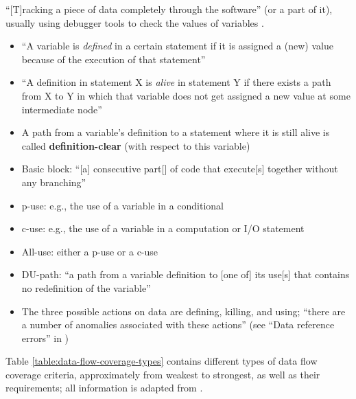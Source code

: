 ``[T]racking a piece of data completely through the software'' (or a part of
it), usually using debugger tools to check the values of variables
\cite[p.~114]{patton_software_2006}.

\begin{itemize}
      \item ``A variable is \emph{defined} in a certain statement if it is
            assigned a (new) value because of the execution of that
            statement'' \cite[p.~424]{van_vliet_software_2000}
      \item ``A definition in statement X is \emph{alive} in statement Y if
            there exists a path from X to Y in which that variable does not
            get assigned a new value at some intermediate node''
            \cite[p.~424]{van_vliet_software_2000}
      \item A path from a variable's definition to a statement where it is
            still alive is called \textbf{definition-clear} (with respect to
            this variable) \cite[p.~424]{van_vliet_software_2000}
      \item Basic block: ``[a] consecutive part[] of code that execute[s]
            together without any branching'' \cite[p.~477]{peters_software_2000}
      \item \acf{p-use}: e.g., the use of a variable in a conditional
            \cite[p.~424]{van_vliet_software_2000}
      \item \acf{c-use}: e.g., the use of a variable in a computation or I/O
            statement \cite[p.~424]{van_vliet_software_2000}
      \item All-use: either a \acs{p-use} or a \acs{c-use}~
            \cite[p.~478]{peters_software_2000}
      \item DU-path: ``a path from a variable definition to [one of] its use[s]
            that contains no redefinition of the variable''
            \cite[pp.~478-479]{peters_software_2000}
      \item The three possible actions on data are defining, killing, and using;
            ``there are a number of anomalies associated with these actions''
            \cite[pp.~478,480]{peters_software_2000}  (see ``Data reference errors'' in
            )
\end{itemize}

Table \ref{table:data-flow-coverage-types} contains different types of data
flow coverage criteria, approximately from weakest to strongest, as well as
their requirements; all information is adapted from
\cite[pp.~424-425]{van_vliet_software_2000} .

